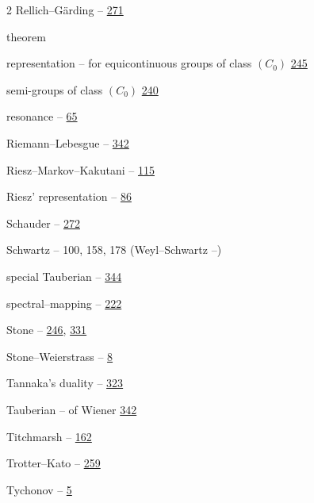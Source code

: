 \begin{multicols}{2}
\noindent Rellich--Gärding -- \hyperlink{page.271}{271}\par
\noindent theorem\par
\hspace*{1.1em}representation -- for equicontinuous groups of class $ (C_{0}) $ \hyperlink{page.245}{245}\par
\hspace*{2.2em}semi-groups of class $ (C_{0}) $ \hyperlink{page.240}{240}\par
\hspace*{1.1em}resonance -- \hyperlink{page.65}{65}\par
\hspace*{1.1em}Riemann--Lebesgue -- \hyperlink{page.342}{342}\par
\hspace*{1.1em}Riesz--Markov--Kakutani -- \hyperlink{page.115}{115}\par
\hspace*{1.1em}Riesz' representation -- \hyperlink{page.86}{86}\par
\hspace*{1.1em}Schauder -- \hyperlink{page.272}{272}\par
\hspace*{1.1em}Schwartz -- 100, 158, 178 (Weyl--Schwartz --)\par
\hspace*{1.1em}special Tauberian -- \hyperlink{page.344}{344}\par
\hspace*{1.1em}spectral--mapping -- \hyperlink{page.222}{222}\par
\hspace*{1.1em}Stone -- \hyperlink{page.246}{246}, \hyperlink{page.331}{331}\par
\hspace*{1.1em}Stone--Weierstrass -- \hyperlink{page.8}{8}\par
\hspace*{1.1em}Tannaka's duality -- \hyperlink{page.323}{323}\par
\hspace*{1.1em}Tauberian -- of Wiener \hyperlink{page.342}{342}\par
\hspace*{1.1em}Titchmarsh -- \hyperlink{page.162}{162}\par
\hspace*{1.1em}Trotter--Kato -- \hyperlink{page.259}{259}\par
\hspace*{1.1em}Tychonov -- \hyperlink{page.5}{5}\par

\end{multicols}
